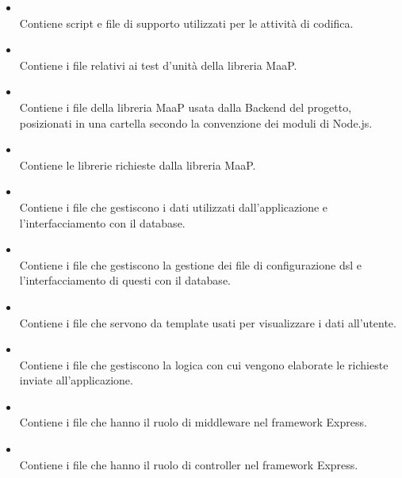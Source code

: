 \begin{itemize}
 \item \textbf{} \\
	Contiene script e file di supporto utilizzati per le attività di codifica.

 \item \textbf{} \\
	Contiene i file relativi ai test d'unità della libreria MaaP.

 \item \textbf{} \\
	Contiene i file della libreria MaaP usata dalla Backend del progetto, posizionati in una cartella  secondo la convenzione dei moduli di Node.js.

 \item \textbf{} \\
	Contiene le librerie richieste dalla libreria MaaP.

 \item \textbf{} \\
	Contiene i file che gestiscono i dati utilizzati dall'applicazione e l'interfacciamento con il database.

 \item \textbf{} \\
	Contiene i file che gestiscono la gestione dei file di configurazione dsl e l'interfacciamento di questi con il database.

 \item \textbf{} \\
	Contiene i file che servono da template usati per visualizzare i dati all'utente.

 \item \textbf{} \\
	Contiene i file che gestiscono la logica con cui vengono elaborate le richieste inviate all'applicazione.

 \item \textbf{} \\
	Contiene i file che hanno il ruolo di middleware nel framework Express.

 \item \textbf{} \\
	Contiene i file che hanno il ruolo di controller nel framework Express.


\end{itemize}
